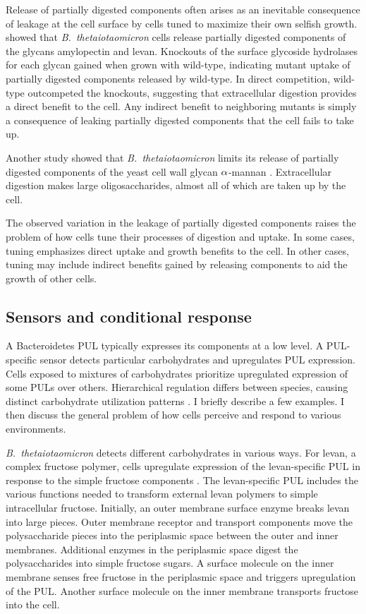\documentclass[\mydocfontsize]{article}
\begin{document}
\begin{multicols}{2}
Release of partially digested components often arises as an inevitable consequence of leakage at the cell surface by cells tuned to maximize their own selfish growth. \textcite{rakoff-nahoum16the-evolution} showed that \textit{B.\ thetaiotaomicron} cells release partially digested components of the glycans amylopectin and levan. Knockouts of the surface glycoside hydrolases for each glycan gained when grown with wild-type, indicating mutant uptake of partially digested components released by wild-type. In direct competition, wild-type outcompeted the knockouts, suggesting that extracellular digestion provides a direct benefit to the cell. Any indirect benefit to neighboring mutants is simply a consequence of leaking partially digested components that the cell fails to take up.  

Another study showed that \textit{B.\ thetaiotaomicron} limits its release of partially digested components of the yeast cell wall glycan $\alpha$-mannan \autocite{cuskin15human}. Extracellular digestion makes large oligosaccharides, almost all of which are taken up by the cell. 

The observed variation in the leakage of partially digested components raises the problem of how cells tune their processes of digestion and uptake. In some cases, tuning emphasizes direct uptake and growth benefits to the cell. In other cases, tuning may include indirect benefits gained by releasing components to aid the growth of other cells. 

\subsection{Sensors and conditional response}

A Bacteroidetes PUL typically expresses its components at a low level. A PUL-specific sensor detects particular carbohydrates and upregulates PUL expression. Cells exposed to mixtures of carbohydrates prioritize upregulated expression of some PULs over others. Hierarchical regulation differs between species, causing distinct carbohydrate utilization patterns \autocite{grondin17polysaccharide}. I briefly describe a few examples. I then discuss the general problem of how cells perceive and respond to various environments.

\textit{B.\ thetaiotaomicron} detects different carbohydrates in various ways. For levan, a complex fructose polymer, cells upregulate expression of the levan-specific PUL in response to the simple fructose components \autocite{sonnenburg10specificity}. The levan-specific PUL includes the various functions needed to transform external levan polymers to simple intracellular fructose. Initially, an outer membrane surface enzyme breaks levan into large pieces. Outer membrane receptor and transport components move the polysaccharide pieces into the periplasmic space between the outer and inner membranes. Additional enzymes in the periplasmic space digest the polysaccharides into simple fructose sugars. A surface molecule on the inner membrane senses free fructose in the periplasmic space and triggers upregulation of the PUL. Another surface molecule on the inner membrane transports fructose into the cell.


\end{multicols}
\end{document}
